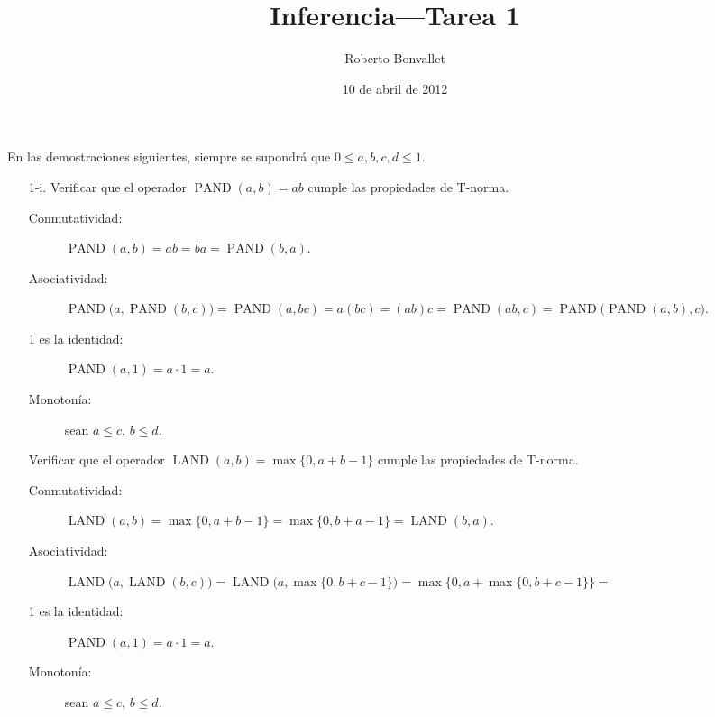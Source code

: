\documentclass{article}
\title{Inferencia---Tarea 1}
\author{Roberto Bonvallet}
\date{10 de abril de 2012}
\DeclareMathOperator{\LAND}{LAND}
\DeclareMathOperator{\PAND}{PAND}
\begin{document}
\maketitle

En las demostraciones siguientes,
siempre se supondrá que
\(0\le a, b, c, d\le 1\).

\begin{enumerate}[
  label=\arabic*.,
  font=\LARGE\bfseries,%
  labelindent=-.5in,%
  leftmargin=0pt,%
  labelsep=1em%
]

  \item[1-i.]
    Verificar que el operador \(\PAND(a, b) = ab\)
    cumple las propiedades de T-norma.
    \begin{description}
      \item[Conmutatividad:]
        \(
          \PAND(a, b) =
          ab =
          ba =
          \PAND(b, a).
        \)
      \item[Asociatividad:]
        \(
          \PAND\bigl(a, \PAND(b, c)\bigr) =
          \PAND(a, bc) =
          a(bc) =
          (ab)c =
          \PAND(ab, c) =
          \PAND\bigl(\PAND(a, b), c\bigr).
        \)
      \item[1 es la identidad:]
        \(
          \PAND(a, 1) = a\cdot 1 = a.
        \)
      \item[Monotonía:] sean \(a\le c\), \(b\le d\).

    \end{description}

    Verificar que el operador \(\LAND(a, b) = \max\{0, a + b - 1\}\)
    cumple las propiedades de T-norma.
    \begin{description}
      \item[Conmutatividad:]
        \(
          \LAND(a, b) =
          \max\{0, a + b - 1\} =
          \max\{0, b + a - 1\} =
          \LAND(b, a).
        \)
      \item[Asociatividad:]
        \(
          \LAND\bigl(a, \LAND(b, c)\bigr) =
          \LAND\bigl(a, \max\{0, b + c - 1\}\bigr) =
          \max\bigl\{0, a + \max\{0, b + c - 1\}\bigl\} =
        \)
      \item[1 es la identidad:]
        \(
          \PAND(a, 1) = a\cdot 1 = a.
        \)
      \item[Monotonía:] sean \(a\le c\), \(b\le d\).

    \end{description}


\end{enumerate}
\end{document}
